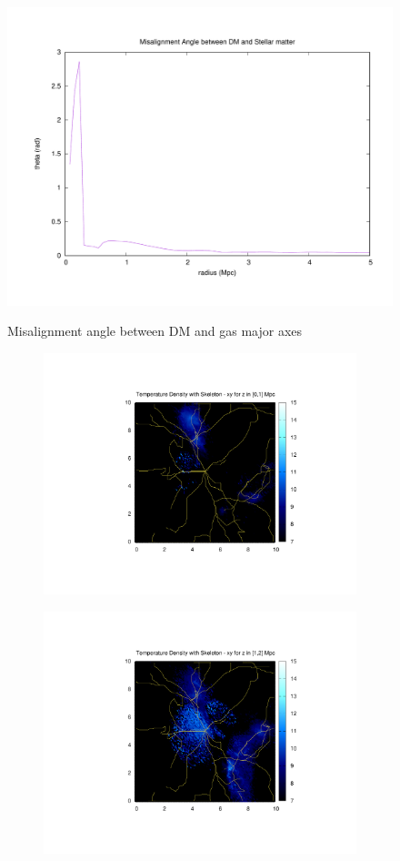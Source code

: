 \documentclass[journal]{IEEEtran}
\begin{document}
\begin{figure}[!t]
\centering
\includegraphics[width=0.5\linewidth]{GasDMAlign.pdf}
\label{fig:DMgasAlign}
\caption{Misalignment angle between DM and gas major axes}
\end{figure}

\begin{figure}[!t]
	\begin{subfigure}[t]{0.3\textwidth}
		\centering
		\includegraphics[width=\linewidth]{TempDenSkel01.pdf}
	\end{subfigure}
	\quad
	\begin{subfigure}[t]{0.3\textwidth}
		\centering
		\includegraphics[width=\linewidth]{TempDenSkel02.pdf}

\end{subfigure}
\end{figure}
\end{document}
